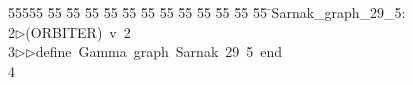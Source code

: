 %
%
\begin{tabbing}
55555 \= 55 \= 55 \= 55 \= 55 \= 55 \= 55 \= 55 \= 55 \= 55 \= 55 \= 55 \= 55 \= \>Sarnak\_graph\_29\_5:\\[0pt]
2\>$\triangleright$\>(ORBITER)\ v\ 2\ \\[0pt]
3\>$\triangleright$\>$\triangleright$\>define\ Gamma\ graph\ Sarnak\ 29\ 5\ end\ \\[0pt]
4\>\end{tabbing}

